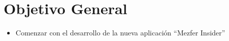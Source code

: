 \section{Objetivo General}
    \begin{itemize}
        \item Comenzar con el desarrollo de la nueva aplicación ``Mezfer Insider''
    \end{itemize}